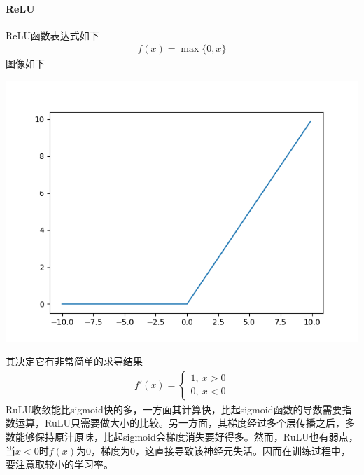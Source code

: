 \paragraph{ReLU}
ReLU函数表达式如下
\begin{eqnarray}
f(x)=\max\{0,x\}
\end{eqnarray}
图像如下
\begin{center}
\includegraphics[scale=0.5]{../figures/NN5.png} 
\end{center}
其决定它有非常简单的求导结果
\begin{eqnarray}
f'(x)=
\left\lbrace
\begin{aligned}
1,\ x>0\\
0,\ x<0
\end{aligned}
\right.
\end{eqnarray}
RuLU收敛能比sigmoid快的多，一方面其计算快，比起sigmoid函数的导数需要指数运算，RuLU只需要做大小的比较。另一方面，其梯度经过多个层传播之后，多数能够保持原汁原味，比起sigmoid会梯度消失要好得多。然而，RuLU也有弱点，当$x<0$时$f(x)$为0，梯度为0，这直接导致该神经元失活。因而在训练过程中，要注意取较小的学习率。
